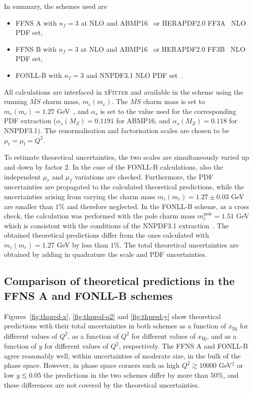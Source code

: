 \documentclass[pdftex,twocolumn,epjc3]{svjour3}          %
\newcommand{\abmp} {ABMP16\xspace}
\newcommand{\nnpdf} {NNPDF3.1\xspace}
\newcommand{\xfitter} {\textsc{xFitter}\xspace}
\newcommand{\xbj}{\ensuremath{x_{\text{Bj}}}\xspace}
\newcommand{\fonll} {{FONLL-B}\xspace}
\newcommand{\ffns} {{FFNS A}\xspace}
\newcommand{\ffnsb} {{FFNS B}\xspace}
\newcommand{\ffthreea} {{HERAPDF2.0 FF3A}\xspace}
\newcommand{\ffthreeb} {{HERAPDF2.0 FF3B}\xspace}
\begin{document}
In summary, the schemes used are
\begin{itemize}
  \item \ffns with $n_f = 3$ at NLO and \abmp~\cite{Alekhin:2018pai} or \ffthreea~\cite{Abramowicz:2015mha} NLO PDF set,
  \item \ffnsb with $n_f = 3$ at NLO and \abmp~\cite{Alekhin:2018pai} or \ffthreeb~\cite{Abramowicz:2015mha} NLO PDF set,
  \item FONLL-B with $n_f = 3$ and \nnpdf NLO PDF set~\cite{Ball:2017nwa}.
\end{itemize}
All calculations are interfaced in \xfitter and available in the scheme using the running $\overline{MS}$ charm mass, $m_c(m_c)$.
The $\overline{MS}$ charm mass is set to $m_c(m_c) = 1.27$ GeV~\cite{pdg}, and $\alpha_s$ is set to the value used for the corresponding PDF extraction ($\alpha_s(M_Z) = 0.1191$ for \abmp, and $\alpha_s(M_Z) = 0.118$ for \nnpdf).
The renormalisation and factorisation scales are chosen to be $\mu_\mathrm{r} = \mu_\mathrm{f} = Q^2$.

To estimate theoretical uncertainties, the two scales are simultaneously varied up and down by factor $2$. In the case of the \fonll calculations, also the independent $\mu_r$ and $\mu_f$ variations are checked. Furthermore, the PDF uncertainties are propagated to the calculated theoretical predictions, while the uncertainties arising from varying the charm mass $m_c(m_c) = 1.27 \pm 0.03$ GeV are smaller than $1\%$ and therefore neglected. In the \fonll scheme, as a cross check, the calculation was performed with the pole charm mass $m_c^{\text{pole}} = 1.51$ GeV which is consistent with the conditions of the \nnpdf extraction~\cite{Ball:2017nwa}. The obtained theoretical predictions differ from the ones calculated with $m_c(m_c) = 1.27$ GeV by less than $1\%$.
The total theoretical uncertainties are obtained by adding in quadrature the scale and PDF uncertainties.


\subsection{Comparison of theoretical predictions in the \ffns and \fonll schemes}
\label{sec:thpred-comparison}

Figures~\ref{fig:thpred-x}, \ref{fig:thpred-q2} and \ref{fig:thpred-y} show theoretical predictions with their total uncertainties in both schemes as a function of \xbj for different values of $Q^2$, as a function of $Q^2$ for different values of \xbj, and as a function of $y$ for different values of $Q^2$, respectively. The \ffns and \fonll agree reasonably well, within uncertainties of moderate size, in the bulk of the phase space. However, in phase space corners such as high $Q^2 \gtrsim 10000$ GeV$^2$ or low $y \lesssim 0.05$ the predictions in the two schemes differ by more than $50\%$, and these differences are not covered by the theoretical uncertainties.
\end{document}
